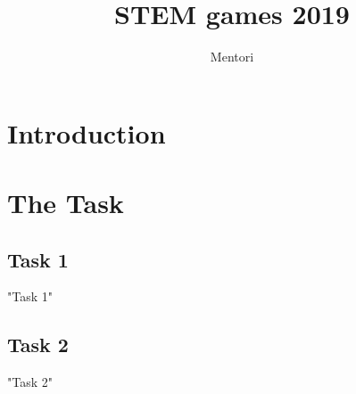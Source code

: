\documentclass{article}
\title{STEM games 2019}
\author{Mentori}
\begin{document}
	
	\maketitle
	
	
	
	\section{Introduction}
	
	
	\section{The Task}
	
	\subsection{Task 1}
	
	{"Task 1"}
	
	\subsection{Task 2}
	
	{"Task 2"}
	
	
	
\end{document}
